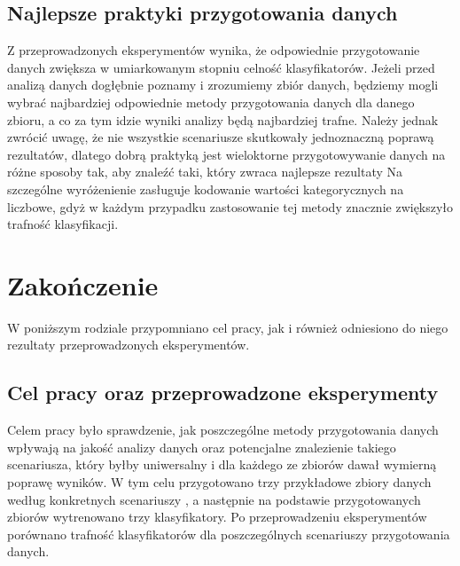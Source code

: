 \documentclass[oneside]{book}
\begin{document}
\section{Najlepsze praktyki przygotowania danych}

Z przeprowadzonych eksperymentów wynika, 
że odpowiednie przygotowanie danych zwiększa w umiarkowanym stopniu celność 
klasyfikatorów. Jeżeli przed analizą danych dogłębnie poznamy i zrozumiemy zbiór danych,
będziemy mogli wybrać najbardziej odpowiednie metody przygotowania danych dla danego zbioru,
a co za tym idzie wyniki analizy będą najbardziej trafne.
Należy jednak zwrócić uwagę, że nie wszystkie 
scenariusze skutkowały jednoznaczną poprawą rezultatów, dlatego dobrą praktyką jest
wieloktorne przygotowywanie danych na różne sposoby tak, aby znaleźć taki, który zwraca najlepsze rezultaty 
Na szczególne wyróżenienie zasługuje kodowanie wartości 
kategorycznych na liczbowe, gdyż w każdym przypadku zastosowanie 
tej metody znacznie zwiększyło trafność klasyfikacji.

\chapter*{Zakończenie}

W poniższym rodziale przypomniano cel pracy, 
jak i również odniesiono do niego rezultaty 
przeprowadzonych eksperymentów.

\section*{Cel pracy oraz przeprowadzone eksperymenty}
Celem pracy było sprawdzenie, jak poszczególne metody przygotowania danych
wpływają na jakość analizy danych oraz potencjalne znalezienie takiego scenariusza, który
byłby uniwersalny i dla każdego ze zbiorów dawał wymierną poprawę wyników.
W tym celu przygotowano trzy przykładowe zbiory danych według konkretnych scenariuszy
, a następnie na podstawie przygotowanych
zbiorów wytrenowano trzy klasyfikatory. 
Po przeprowadzeniu eksperymentów porównano trafność klasyfikatorów dla poszczególnych 
scenariuszy przygotowania danych.
\end{document}
